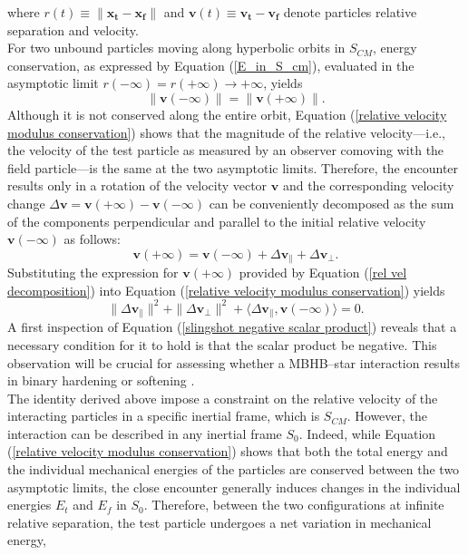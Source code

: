 \documentclass[12pt,twoside,openany]{book}
\begin{document}
 where  $r(t)\equiv \|\mathbf{x_t}-\mathbf{x_f}\|$ and $\mathbf{v}(t)\equiv \mathbf{v_t}-\mathbf{v_f}$ denote particles relative separation and velocity.\\For two unbound particles moving along hyperbolic orbits in $S_{CM}$, energy conservation, as expressed by Equation (\ref{E_in_S_cm}), evaluated in the asymptotic limit $r(-\infty)=r(+\infty)\rightarrow+\infty$, yields
\begin{equation}\label{relative velocity modulus conservation}
     \|\mathbf{v}(-\infty)\|=  \|\mathbf{v}(+\infty)\|.
\end{equation}
Although it is not conserved along the entire orbit, Equation (\ref{relative velocity modulus conservation}) shows that the magnitude of the relative velocity---i.e., the velocity of the test particle as measured by an observer comoving with the field particle---is the same at the two asymptotic limits. Therefore, the encounter results only in a rotation of the velocity vector $\mathbf{v}$ and the corresponding velocity change $\Delta\mathbf{v}=\mathbf{v}(+\infty)-\mathbf{v}(-\infty)$ can be conveniently decomposed  as the sum of the components perpendicular and parallel to the initial relative velocity $\mathbf{v}(-\infty)$ as follows:
\begin{equation}\label{rel vel decomposition}
    \mathbf{v}(+\infty)=\mathbf{v}(-\infty)+\Delta\mathbf{v}_\parallel +\Delta\mathbf{v}_\perp.
\end{equation}
Substituting the expression for $\mathbf{v}(+\infty)$ provided by Equation (\ref{rel vel decomposition}) into Equation (\ref{relative velocity modulus conservation}) yields
\begin{equation}\label{slingshot negative scalar product}
     \| \Delta\mathbf{v}_\parallel\|^2+  \| \Delta\mathbf{v}_\perp\|^2+\langle \Delta\mathbf{v}_\parallel, \mathbf{v}(-\infty) \rangle=0.
\end{equation}
A first inspection of Equation (\ref{slingshot negative scalar product}) reveals that a necessary condition for it to hold is that the scalar product be negative. This observation will be crucial for assessing whether a MBHB--star interaction results in binary hardening or softening \parencite{Ciotti_book}.\\The identity derived above impose a constraint on the relative velocity of the interacting particles in a specific inertial frame, which is $S_{CM}$. However, the interaction can be described in any inertial frame $S_0$. Indeed, while Equation (\ref{relative velocity modulus conservation}) shows that both the total energy and the individual mechanical energies of the particles are conserved between the two asymptotic limits, the close encounter generally induces changes in the individual energies $E_t$ and $E_f$ in $S_0$. Therefore, between the two configurations at infinite relative separation, the test particle undergoes a net variation in mechanical energy,
\end{document}

